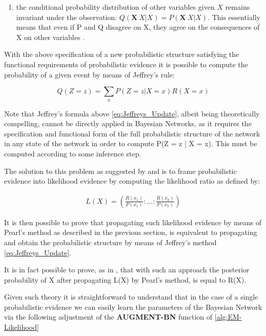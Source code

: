 \documentclass[11pt]{article}
\begin{document}
\begin{article}
\begin{enumerate}
\item the conditional probability distribution of other variables given
\(X\) remains invariant under the observation: \(Q(\textbf{X} \
     {X} | X) = P (\textbf{X} \ {X} | X)\). This essentially means that
even if P and Q disagree on X, they agree on the consequences of
X on other variables \cite{Mrad_2015}.
\end{enumerate}

With the above specification of a new probabilistic structure
satisfying the functional requirements of probabilistic evidence it
is possible to compute the probability of a given event by means of
Jeffrey's rule:

\begin{equation} \label{eq:Jeffreys_Update}
 Q(Z = z) = \sum_x P(Z = z | X = x) R(X = x)
\end{equation}

Note that Jeffrey's formula above \ref{eq:Jeffreys_Update}, albeit
being theoretically compelling, cannot be directly applied in
Bayesian Networks, as it requires the specification and functional
form of the full probabilistic structure of the network in any state
of the network in order to compute P(Z = z | X = x). This must be
computed according to some inference step.

The solution to this problem as suggested by \cite{Chan_2005} and
\cite{PENG_2010} is to frame probabilistic evidence into likelihood
evidence by computing the likelihood ratio as defined by:

\begin{align} \label{eq:probabilistic-to-likelihood-evidence}
 L(X) = (\frac{R(x_1)}{P(x_1)}: ... : \frac{R(x_k)}{P(x_k)})
\end{align}

It is then possible to prove that propagating such likelihood
evidence by means of Pearl's method as described in the previous
section, is equivalent to propagating and obtain the probabilistic
structure by means of Jeffrey's method \ref{eq:Jeffreys_Update}.

It is in fact possible to prove, as in \cite{PENG_2010}, that with
such an approach the posterior probability of X after propagating
L(X) by Pearl’s method, is equal to R(X).

Given such theory it is straightforward to understand that
in the case of a single probabilistic evidence we can easily learn
the parameters of the Bayesian Network via the following adjustment
of the \textbf{AUGMENT-BN} function of \ref{alg:EM-Likelihood}


\end{article}
\end{document}
